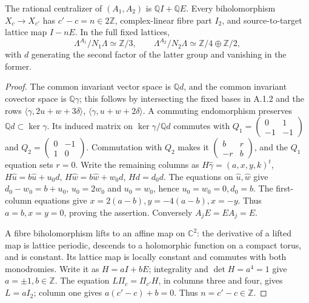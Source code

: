 \begin{proposition}\label{fam:src:A.2.1}\label{fam:st:A.2.1}
The rational centralizer of $(A_1,A_2)$ is $\mathbb QI+\mathbb QE$. Every biholomorphism $X_c\to X_{c'}$ has $c'-c=n\in2\mathbb Z$, complex-linear fibre part $I_2$, and source-to-target lattice map $I-nE$. In the full fixed lattices,
\[
 \Lambda^{A_1}/N_1\Lambda\simeq\mathbb Z/3,\qquad
 \Lambda^{A_2}/N_2\Lambda\simeq\mathbb Z/4\oplus\mathbb Z/2,
\]
with $d$ generating the second factor of the latter group and vanishing in the former.
\end{proposition}
\begin{proof}
The common invariant vector space is $\mathbb Qd$, and the common invariant covector space is $\mathbb Q\gamma$; this follows by intersecting the fixed bases in A.1.2 and the rows $\langle\gamma,2u+w+3\delta\rangle$, $\langle\gamma,u+w+2\delta\rangle$. A commuting endomorphism preserves $\mathbb Qd\subset\ker\gamma$. Its induced matrix on $\ker\gamma/\mathbb Qd$ commutes with
$Q_1=\left(\begin{smallmatrix}0&1\\-1&-1\end{smallmatrix}\right)$ and $Q_2=\left(\begin{smallmatrix}0&-1\\1&0\end{smallmatrix}\right)$. Commutation with $Q_2$ makes it $\left(\begin{smallmatrix}b&r\\-r&b\end{smallmatrix}\right)$, and the $Q_1$ equation sets $r=0$. Write the remaining columns as
$H\widehat\gamma=(a,x,y,k)^t$, $H\widehat u=b\widehat u+u_0d$, $H\widehat w=b\widehat w+w_0d$, $Hd=d_0d$. The equations on $\widehat u,\widehat w$ give $d_0-w_0=b+u_0$, $u_0=2w_0$ and $u_0=w_0$, hence $u_0=w_0=0,d_0=b$. The first-column equations give $x=2(a-b),y=-4(a-b),x=-y$. Thus $a=b,x=y=0$, proving the assertion. Conversely $A_jE=EA_j=E$.

A fibre biholomorphism lifts to an affine map on $\mathbb C^2$: the derivative of a lifted map is lattice periodic, descends to a holomorphic function on a compact torus, and is constant. Its lattice map is locally constant and commutes with both monodromies. Write it as $H=aI+bE$; integrality and $\det H=a^4=1$ give $a=\pm1,b\in\mathbb Z$. The equation $L\Pi_c=\Pi_{c'}H$, in columns three and four, gives $L=aI_2$; column one gives $a(c'-c)+b=0$. Thus $n=c'-c\in\mathbb Z$.


\end{proof}
